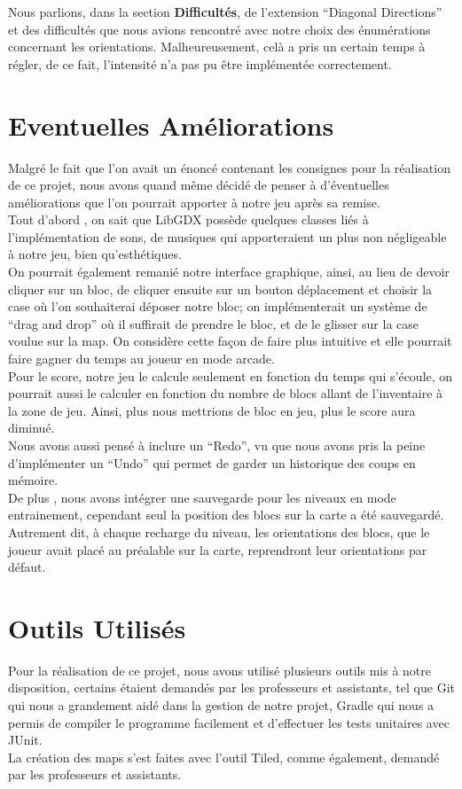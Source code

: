 \documentclass[a4paper,10pt]{article}
\begin{document}
Nous parlions, dans la section \textbf{Difficultés}, de l'extension ``Diagonal Directions'' et des difficultés que nous avions rencontré avec notre
choix des énumérations concernant les orientations. Malheureusement, celà a pris un certain temps à régler, de ce fait, l'intensité n'a pas pu être implémentée
correctement.


\section{Eventuelles Améliorations}
Malgré le fait que l'on avait un énoncé contenant les consignes pour la réalisation de ce projet, nous avons quand même décidé de penser à d'éventuelles
améliorations que l'on pourrait apporter à notre jeu après sa remise.\\
Tout d'abord , on sait que LibGDX possède quelques classes liés à l'implémentation de sons, de musiques qui apporteraient un plus
non négligeable à notre jeu, bien qu'esthétiques.\\
On pourrait également remanié notre interface graphique, ainsi, au lieu de devoir cliquer sur un bloc, de cliquer ensuite sur un bouton déplacement
et choisir la case où l'on souhaiterai déposer notre bloc; on implémenterait un système de ``drag and drop'' où il suffirait de prendre le bloc,
et de le glisser sur la case voulue sur la map. On considère cette façon de faire plus intuitive et elle pourrait faire gagner du temps au joueur
en mode arcade.\\
Pour le score, notre jeu le calcule seulement en fonction du temps qui s'écoule, on pourrait aussi le calculer en fonction du nombre de blocs allant
de l'inventaire à la zone de jeu. Ainsi, plus nous mettrions de bloc en jeu, plus le score aura diminué. \\
Nous avons aussi pensé à inclure un ``Redo'', vu que nous avons pris la peine d'implémenter un ``Undo'' qui permet de garder un historique des coups en
mémoire. \\
De plus , nous avons intégrer une sauvegarde pour les niveaux en mode entrainement, cependant seul la position des blocs sur la carte a été sauvegardé.
Autrement dit, à chaque recharge du niveau, les orientations des blocs, que le joueur avait placé au préalable sur la carte, reprendront leur 
orientations par défaut. 

\section{Outils Utilisés}
Pour la réalisation de ce projet, nous avons utilisé plusieurs outils mis à notre disposition, certains étaient demandés par les professeurs et assistants,
tel que Git qui nous a grandement aidé dans la gestion de notre projet, Gradle qui nous a permis de compiler le programme facilement et d'effectuer les tests unitaires
avec JUnit.\\
La création des maps s'est faites avec l'outil Tiled, comme également, demandé par les professeurs et assistants. \\
\end{document}
